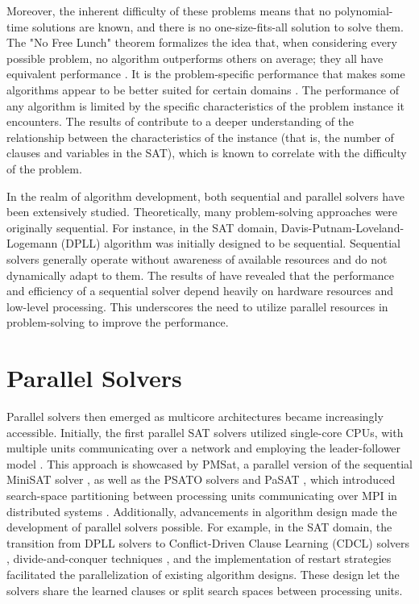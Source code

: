Moreover, the inherent difficulty of these problems means that no polynomial-time solutions are known, and there is no one-size-fits-all solution to solve them. The "No Free Lunch" theorem formalizes the idea that, when considering every possible problem, no algorithm outperforms others on average; they all have equivalent performance \cite{585893}. It is the problem-specific performance that makes some algorithms appear to be better suited for certain domains \cite{585893}. The performance of any algorithm is limited by the specific characteristics of the problem instance it encounters. The results of \cite{10.1007/978-3-540-30201-8_33} contribute to a deeper understanding of the relationship between the characteristics of the instance (that is, the number of clauses and variables in the SAT), which is known to correlate with the difficulty of the problem. 

In the realm of algorithm development, both sequential and parallel solvers have been extensively studied. Theoretically, many problem-solving approaches were originally sequential. For instance, in the SAT domain, Davis-Putnam-Loveland-Logemann (DPLL) algorithm \cite{10.1145/368273.368557} was initially designed to be sequential. Sequential solvers generally operate without awareness of available resources and do not dynamically adapt to them. The results of \cite{10.1007/978-3-642-16242-8_37} have revealed that the performance and efficiency of a sequential solver depend heavily on hardware resources and low-level processing. This underscores the need to utilize parallel resources in problem-solving to improve the performance. 

\section{Parallel Solvers}

Parallel solvers then emerged as multicore architectures became increasingly accessible. Initially, the first parallel SAT solvers utilized single-core CPUs, with multiple units communicating over a network and employing the leader-follower model \cite{holldobler_short_2011}. This approach is showcased by PMSat, a parallel version of the sequential MiniSAT solver \cite{journals/jsat/GilFS09}, as well as the PSATO solvers \cite{ZHANG1996543} and PaSAT \cite{SINZ2001205}, which introduced search-space partitioning between processing units communicating over MPI in distributed systems \cite{10.1007/978-3-642-16242-8_27}. Additionally, advancements in algorithm design made the development of parallel solvers possible. For example, in the SAT domain, the transition from DPLL solvers to Conflict-Driven Clause Learning (CDCL) solvers \cite{biere2009conflict}, divide-and-conquer techniques \cite{lefrioux}, and the implementation of restart strategies \cite{10.1007/978-3-540-85110-3_11} facilitated the parallelization of existing algorithm designs. These design let the solvers share the learned clauses or split search spaces between processing units. 

